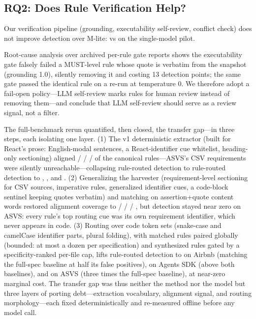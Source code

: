 \documentclass[11pt]{article}
\begin{document}
\subsection{RQ2: Does Rule Verification Help?}
Our verification pipeline (grounding, executability self-review, conflict check)
does not improve detection over M-lite: \mverDetDS{} vs \mliteDetDS{} on the single-model pilot.

\begin{table}[t]
\centering
\caption{Verification gates under the fail-open policy (40-case react19 suite;
tokens = total LLM tokens for the run; $p$ = exact binomial McNemar on the
violation subset, M-verified vs.\ M-lite).}
\label{tab:rq2}

\end{table}

Root-cause analysis over archived per-rule gate reports shows the executability
gate falsely failed a MUST-level rule whose quote is verbatim from the snapshot
(grounding 1.0), silently removing it and costing 13 detection points; the same
gate passed the identical rule on a re-run at temperature 0. We therefore adopt a
fail-open policy---LLM self-review marks rules for human review instead of
removing them---and conclude that LLM self-review should serve as a review signal,
not a filter.

The full-benchmark rerun quantified, then closed, the transfer gap---in three
steps, each isolating one layer. (1) The v1 deterministic extractor (built for
React's prose: English-modal sentences, a React-identifier cue whitelist,
heading-only sectioning) aligned \mlAlignReactVone{} / \mlAlignAgentsVone{} /
\mlAlignAirbnbVone{} / \mlAlignAsvsVone{} of the canonical rules---ASVS's CSV
requirements were silently unreachable---collapsing rule-routed detection to
rule-routed detection to \mliteDetAgentsVone, \mliteDetAirbnbVone, and
\mliteDetAsvsVone. (2) Generalizing
the harvester (requirement-level sectioning for CSV sources, imperative rules,
generalized identifier cues, a code-block sentinel keeping quotes verbatim) and
matching on assertion+quote content words restored alignment coverage to
\mlAlignReact{} / \mlAlignAgents{} / \mlAlignAirbnb{} / \mlAlignAsvs{}, but
detection stayed near zero on ASVS: every rule's top routing cue was its own
requirement identifier, which never appears in code. (3) Routing over code
token sets (snake-case and camelCase identifier parts, plural folding), with
matched rules paired globally (bounded: at most a dozen per specification) and
synthesized rules gated by a specificity-ranked per-file cap, lifts rule-routed
detection to \mliteDetAirbnb{} on Airbnb (matching the full-spec baseline at
half its false positives), \mliteDetAgents{} on Agents SDK (above both
baselines), and \mliteDetAsvs{} on ASVS (three times the full-spec baseline),
at near-zero marginal cost. The transfer gap was thus neither the method nor
the model but three layers of porting debt---extraction vocabulary, alignment
signal, and routing morphology---each fixed deterministically and re-measured
offline before any model call.
\end{document}
